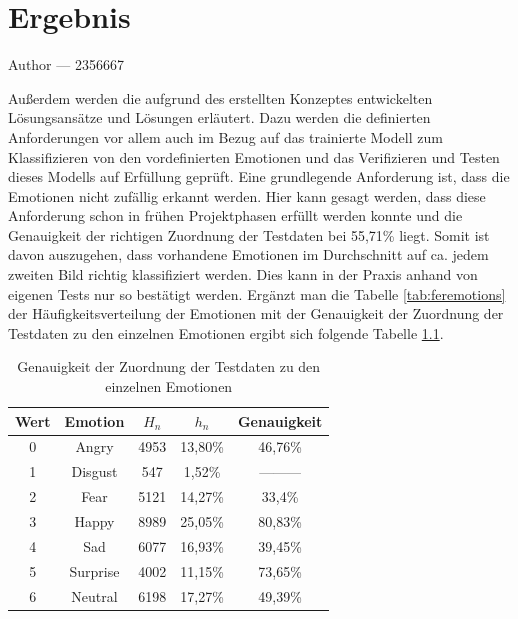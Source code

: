 \documentclass[12pt, a4paper]{report}
\makeatletter
\newcommand{\chapterauthor}[1]{%
  {\parindent0pt\vspace*{-25pt}%
  \large{Author --- }
  \linespread{1.1}\large\scshape#1%
  \par\nobreak\vspace*{35pt} }
  \@afterheading%
}
\makeatother
\begin{document}
\chapter{Ergebnis}
\chapterauthor{2356667}
Außerdem werden die aufgrund des erstellten Konzeptes entwickelten Lösungsansätze und Lösungen erläutert. Dazu werden die definierten Anforderungen vor allem auch im Bezug auf das trainierte Modell zum Klassifizieren von den vordefinierten Emotionen und das Verifizieren und Testen dieses Modells auf Erfüllung geprüft.\newline
Eine grundlegende Anforderung ist, dass die Emotionen nicht zufällig erkannt werden. Hier kann gesagt werden, dass diese Anforderung schon in frühen Projektphasen erfüllt werden konnte und die Genauigkeit der richtigen Zuordnung der Testdaten bei 55,71\% liegt. Somit ist davon auszugehen, dass vorhandene Emotionen im Durchschnitt auf ca. jedem zweiten Bild richtig klassifiziert werden. Dies kann in der Praxis anhand von eigenen Tests nur so bestätigt werden. Ergänzt man die Tabelle \ref{tab:feremotions} der Häufigkeitsverteilung der Emotionen mit der Genauigkeit der Zuordnung der Testdaten zu den einzelnen Emotionen ergibt sich folgende Tabelle \ref{tab:genauigkeitemotions}.
\begin{table}[h]
  \centering
  \begin{tabular}[t]{c|c|c|c|c}
  Wert & Emotion & $H_n$ & $h_n$ & Genauigkeit \\
  \hline
  0 & Angry & 4953 & 13,80\% & 46,76\% \\
  1 & Disgust & 547 & 1,52\% & --------- \\
  2 & Fear & 5121 & 14,27\% & 33,4\% \\
  3 & Happy & 8989 & 25,05\% & 80,83\% \\
  4 & Sad & 6077 & 16,93\% & 39,45\% \\
  5 & Surprise & 4002 & 11,15\% & 73,65\% \\
  6 & Neutral & 6198 & 17,27\% & 49,39\% \\
  \hline
  \end{tabular}
  \caption{Genauigkeit der Zuordnung der Testdaten zu den einzelnen Emotionen}
  \label{tab:genauigkeitemotions}
\end{table} 
\end{document}
